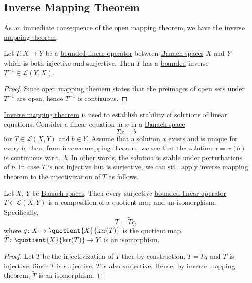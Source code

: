 \subsection{Inverse Mapping Theorem}
As an immediate consequence of the \hyperref[thm:open-mapping]{open mapping theorem}, we have the \hyperref[thm:inverse-mapping]{inverse mapping theorem}.

\begin{theorem}\label{thm:inverse-mapping}
	Let \(T\colon X\to Y\) be a \hyperref[def:bounded-linear-op]{bounded linear operator} between \hyperref[def:Banach-space]{Banach spaces} \(X\) and \(Y\) which is both injective and surjective. Then \(T\) has a \hyperref[rmk:bounded-op]{bounded} inverse \(T^{-1} \in \mathcal{L} (Y, X)\).
\end{theorem}
\begin{proof}
	Since \hyperref[thm:open-mapping]{open mapping theorem} states that the preimages of open sets under \(T^{-1} \) are open, hence \(T^{-1} \) is continuous.
\end{proof}

\hyperref[thm:inverse-mapping]{Inverse mapping theorem} is used to establish stability of solutions of linear equations. Consider a linear equation in \(x\) in a \hyperref[def:Banach-space]{Banach space}
\[
	Tx = b
\]
for \(T\in \mathcal{L} (X, Y)\) and \(b\in Y\). Assume that a solution \(x\) exists and is unique for every \(b\), then, from \hyperref[thm:inverse-mapping]{inverse mapping theorem}, we see that the solution \(x = x(b)\) is continuous w.r.t.\ \(b\). In other words, the solution is stable under perturbations of \(b\). In case \(T\) is not injective but is surjective, we can still apply \hyperref[thm:inverse-mapping]{inverse mapping theorem} to the injectivization of \(T\) as follows.

\begin{corollary}\label{col:surjective-op-are-essentially-quo-maps}
	Let \(X\), \(Y\) be \hyperref[def:Banach-space]{Banach spaces}. Then every surjective \hyperref[def:bounded-linear-op]{bounded linear operator} \(T\in \mathcal{L} (X, Y)\) is a composition of a quotient map and an isomorphism. Specifically,
	\[
		T = \widetilde{T} q,
	\]
	where \(q\colon X\to \quotient{X}{\ker(T)} \) is the quotient map, \(\widetilde{T} \colon \quotient{X}{\ker(T)} \to Y\) is an isomorphism.
\end{corollary}
\begin{proof}
	Let \(\widetilde{T} \) be the injectivization of \(T\) then by construction, \(T = \widetilde{T} q\) and \(\widetilde{T} \) is injective. Since \(T\) is surjective, \(\widetilde{T} \) is also surjective. Hence, by \hyperref[thm:inverse-mapping]{inverse mapping theorem}, \(\widetilde{T} \) is an isomorphism.
\end{proof}

